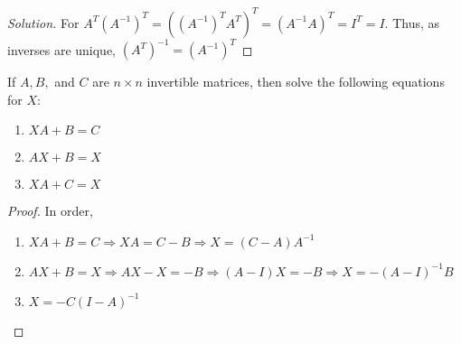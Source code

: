 \documentclass[../main.tex]{subfiles}
\begin{document}
\begin{proof}[Solution]
For $A^T(A^{-1})^T = ((A^{-1})^T A^T)^T = (A^{-1}A)^T = I^T = I$. Thus, as inverses are unique, $(A^T)^{-1} = (A^{-1})^T$
\end{proof}
%
\begin{problem}
If $A,B,$ and $C$ are $n\times n$ invertible matrices, then solve the following equations for $X$:
\begin{enumerate}
\item $XA+B=C$
\item $AX+B=X$
\item $XA+C=X$
\end{enumerate}
\end{problem}
\begin{proof}
In order,
\begin{enumerate}
\item $XA +B=C\Rightarrow XA = C-B \Rightarrow X = (C-A)A^{-1}$
\item $AX+B = X\Rightarrow AX-X=-B \Rightarrow (A-I)X=-B \Rightarrow X = -(A-I)^{-1}B$
\item $X = -C(I-A)^{-1}$
\end{enumerate}
\end{proof}
%
\end{document}
